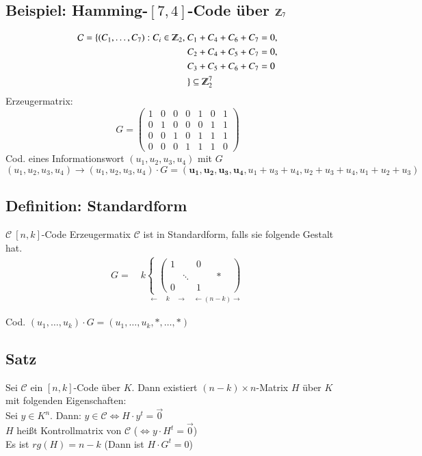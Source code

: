 \subsection{Beispiel: Hamming-$[7,4]$-Code \"uber $\Z_7$}

\begin{align*}
\mathcal{C} = \lbrace (C_1,\ldots,C_7) : C_i \in \Z_2,\ &C_1 + C_4 + C_6 + C_7 = 0,\\
										&C_2 + C_4 + C_5 + C_7 = 0,\\
										&C_3 + C_5 + C_6 + C_7 = 0\\
										 &\rbrace \subseteq \Z_2^7
\end{align*}
\noindent
Erzeugermatrix:
\[	G=
	\begin{pmatrix}
		1 & 0 & 0 & 0 & 1 & 0 & 1\\
		0 & 1 & 0 & 0 & 0 & 1 & 1\\
		0 & 0 & 1 & 0 & 1 & 1 & 1\\
		0 & 0 & 0 & 1 & 1 & 1 & 0
	\end{pmatrix}
\]
Cod. eines Informationswort $(u_1,u_2,u_3,u_4)$ mit $G$
\[
	(u_1,u_2,u_3,u_4) \rightarrow (u_1,u_2,u_3,u_4) \cdot G =  (\mathbf{u_1,u_2,u_3,u_4},u_1+u_3+u_4,u_2+u_3+u_4,u_1+u_2+u_3)
\]
\subsection{Definition: Standardform}
$\mathcal{C} \  [n,k]$-Code Erzeugermatix $\mathcal{C}$ ist in Standardform, falls sie folgende Gestalt hat.
\begin{align*}
	G= \quad
	k
	\underset{\leftarrow \quad k \quad \rightarrow \quad \leftarrow (n-k) \rightarrow}{
	\begin{cases}
	\begin{pmatrix}
		1 & & 0\\
		 & \ddots & & & * & \\
		0 & & 1 & &
	\end{pmatrix}
	\end{cases}
	}
\end{align*}

Cod. $(u_1,\ldots,u_k) \cdot G = (u_1,\ldots,u_k,*,\ldots,*)$

\subsection{Satz}
Sei $\mathcal{C}$ ein $[n,k]$-Code \"uber $K$. Dann existiert $(n-k)\times n$-Matrix $H$ \"uber $K$ mit folgenden Eigenschaften: \\
Sei $y\in K^n$. Dann: $y \in \mathcal{C} \Leftrightarrow H \cdot y^t = \vec{0}$ 
\\
$H$ hei\ss t Kontrollmatrix von $\mathcal{C}$ ($\Leftrightarrow y \cdot H^t = \vec{0}$) \\
Es ist $rg(H)=n-k$ (Dann ist $H \cdot G^t=0$)


